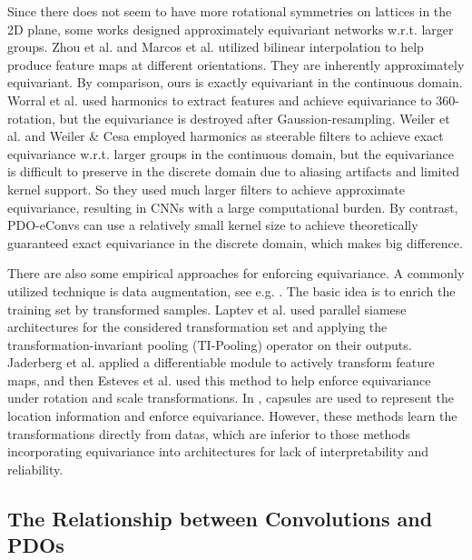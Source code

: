 \documentclass{article}
\begin{document}
Since there does not seem to have more rotational symmetries on lattices in the 2D plane, some works designed approximately equivariant networks w.r.t. larger groups. Zhou et al.  and Marcos et al.  utilized bilinear interpolation to help produce feature maps at different orientations. They are inherently approximately equivariant. By comparison, ours is exactly equivariant in the continuous domain. Worral et al.  used harmonics to extract features and achieve equivariance to 360-rotation, but the equivariance is destroyed after Gaussion-resampling. Weiler et al.  and Weiler \& Cesa   employed harmonics as steerable filters to achieve exact equivariance w.r.t. larger groups in the continuous domain, but the equivariance is difficult to preserve in the discrete domain due to aliasing artifacts and limited kernel support. So they used much larger filters to achieve approximate equivariance, resulting in CNNs with a large computational burden. By contrast, PDO-eConvs can use a relatively small kernel size to achieve theoretically guaranteed exact equivariance in the discrete domain, which makes big difference. 



There are also some empirical approaches for enforcing equivariance. A commonly utilized technique is data augmentation, see e.g. \cite{krizhevsky2012imagenet}. The basic idea is to enrich the training set by transformed samples. Laptev et al.  used parallel siamese architectures for the considered transformation set and applying the transformation-invariant pooling (TI-Pooling) operator on their outputs. Jaderberg et al.  applied a differentiable module to actively transform feature maps, and then Esteves et al.  used this method to help enforce equivariance under rotation and scale transformations. In \cite{sabour2017dynamic,hinton2018matrix}, capsules are used to represent the location information and enforce equivariance. However, these methods learn the transformations directly from datas, which are inferior to those methods incorporating equivariance into architectures for lack of interpretability and reliability.

\subsection{The Relationship between Convolutions and PDOs}
\end{document}
